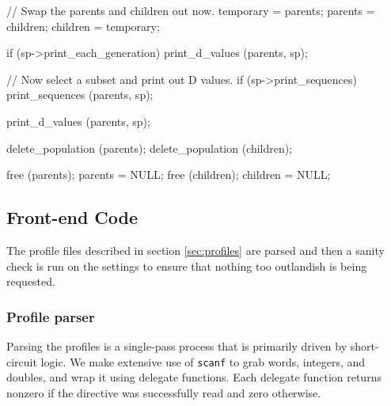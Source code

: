 \documentclass{article}
\begin{document}
\begin{ccode}
{{{      // Swap the parents and children out now.
      temporary = parents;
      parents = children;
      children = temporary;

      if (sp->print_each_generation)
       print_d_values (parents, sp);
    }

    // Now select a subset and print out D values.
    if (sp->print_sequences)
      print_sequences (parents, sp);

    print_d_values (parents, sp);
  }

  delete_population (parents);
  delete_population (children);

  free (parents); parents = NULL;
  free (children); children = NULL;
}
\end{ccode}

    \subsection{Front-end Code}

      The profile files described in section \ref{sec:profiles} are parsed and
      then a sanity check is run on the settings to ensure that nothing too
      outlandish is being requested.

      \subsubsection{Profile parser}
	\label{sec:profile-parser}

	Parsing the profiles is a single-pass process that is primarily driven
	by short-circuit logic. We make extensive use of \verb|scanf| to grab
	words, integers, and doubles, and wrap it using delegate functions.
	Each delegate function returns nonzero if the directive was successfully
	read and zero otherwise.
\end{document}
